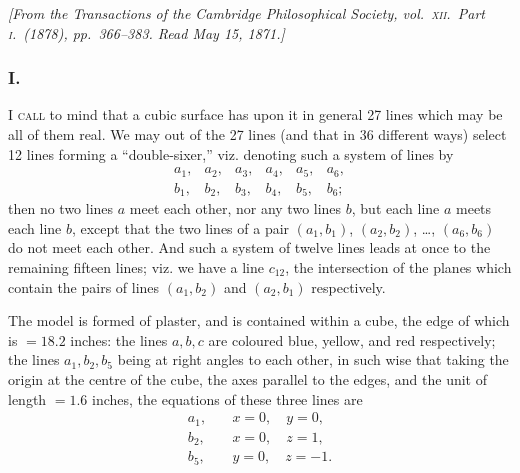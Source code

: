 \documentclass[11pt,a4paper]{article}
\begin{document}
\begin{center}
\textit{[From the Transactions of the Cambridge Philosophical Society, vol.\ \textsc{xii}.\ Part \textsc{i}.\ (1878), pp.\ 366--383. Read May 15, 1871.]}
\end{center}

\subsubsection*{I.}

\textsc{I call} to mind that a cubic surface has upon it in general 27 lines which may
be all of them real. We may out of the 27 lines (and that in 36 different ways)
select 12 lines forming a ``double-sixer,'' viz. denoting such a system of lines by
\[
\begin{array}{cccccc}
a_1,&a_2,&a_3,&a_4,&a_5,&a_6,\\
b_1,&b_2,&b_3,&b_4,&b_5,&b_6;
\end{array}
\]
then no two lines $a$ meet each other, nor any two lines $b$, but each line $a$ meets
each line $b$, except that the two lines of a pair $(a_1,b_1)$, $(a_2,b_2)$,
\ldots, $(a_6,b_6)$ do not meet each other. And such a system of twelve lines leads
at once to the remaining fifteen lines; viz. we have a line $c_{12}$, the intersection
of the planes which contain the pairs of lines $(a_1,b_2)$ and $(a_2,b_1)$
respectively.

The model is formed of plaster, and is contained within a cube, the edge of which is
$=18.2$ inches: the lines $a,b,c$ are coloured blue, yellow, and red respectively;
the lines $a_1,b_2,b_5$ being at right angles to each other, in such wise that taking
the origin at the centre of the cube, the axes parallel to the edges, and the unit of
length $=1.6$ inches, the equations of these three lines are
\begin{align*}
a_1,\quad & x=0,\quad y=0,\\
b_2,\quad & x=0,\quad z=1,\\
b_5,\quad & y=0,\quad z=-1.
\end{align*}
\end{document}
